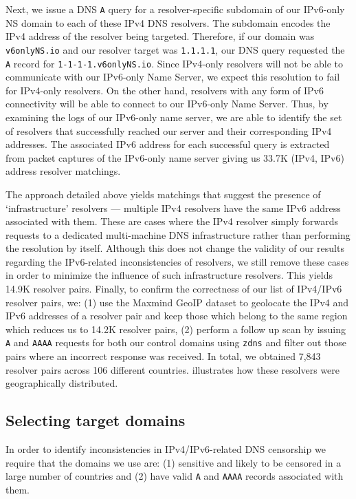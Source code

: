 Next, we issue a DNS {\tt A} query for a resolver-specific subdomain of our
IPv6-only NS domain to each of these IPv4 DNS resolvers. The subdomain encodes
the IPv4 address of the resolver being targeted. Therefore, if our domain was
{\tt v6onlyNS.io} and our resolver target was {\tt 1.1.1.1}, our DNS query
requested the {\tt A} record for {\tt 1-1-1-1.v6onlyNS.io}.
%
Since IPv4-only resolvers will not be able to communicate with our IPv6-only
Name Server, we expect this resolution to fail for IPv4-only resolvers.
On the other hand, resolvers with any form of IPv6 connectivity will be
able to connect to our IPv6-only Name Server.
%
Thus, by examining the logs of our IPv6-only name server, we are able
to identify the set of resolvers that successfully reached our server and
their corresponding IPv4 addresses. The associated IPv6 address for each
successful query is extracted from packet captures of the IPv6-only name
server giving us 33.7K (IPv4, IPv6) address resolver matchings.

The approach detailed above yields matchings that suggest the presence of
`infrastructure' resolvers --- \eg multiple IPv4 resolvers have the same IPv6
address associated with them. These are cases where the IPv4 resolver simply
forwards requests to a dedicated multi-machine DNS infrastructure rather than
performing the resolution by itself. Although this does not change the validity
of our results regarding the IPv6-related inconsistencies of resolvers, we
still remove these cases in order to minimize the influence of such
infrastructure resolvers. This yields 14.9K resolver pairs.
%
Finally, to confirm the correctness of our list of IPv4/IPv6 resolver pairs, we:
(1) use the Maxmind GeoIP dataset \cite{maxmind-connectiondb} to geolocate the
IPv4 and IPv6 addresses of a resolver pair and keep those which belong to the
same region which reduces us to 14.2K resolver pairs, (2) perform a follow up
scan by issuing {\tt A} and {\tt AAAA} requests for both our control domains
using {\tt zdns} \cite{Durumeric13zmap} and filter out those pairs where an
incorrect response was received.
% 
In total, we obtained 7,843 resolver pairs across 106 different countries.
 illustrates how these resolvers were geographically
distributed.


\subsection{Selecting target domains}
\label{sec:methodology:domains}
In order to identify inconsistencies in IPv4/IPv6-related DNS censorship we
require that the domains we use are: (1) sensitive and likely to be censored in
a large number of countries and (2) have valid {\tt A} and {\tt AAAA} records
associated with them.

